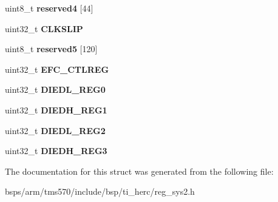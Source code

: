 \begin{DoxyCompactItemize}
uint8\+\_\+t {\bfseries reserved4} \mbox{[}44\mbox{]}
\item 
\mbox{\label{structtms570__sys2__t_a0a35694e164a15cded741c59290bd960}} 
uint32\+\_\+t {\bfseries C\+L\+K\+S\+L\+IP}
\item 
\mbox{\label{structtms570__sys2__t_a928c06fb1b47d13ab7d9c687295961b0}} 
uint8\+\_\+t {\bfseries reserved5} \mbox{[}120\mbox{]}
\item 
\mbox{\label{structtms570__sys2__t_a6b71a328a94e35321a5730135f1490ad}} 
uint32\+\_\+t {\bfseries E\+F\+C\+\_\+\+C\+T\+L\+R\+EG}
\item 
\mbox{\label{structtms570__sys2__t_a91ce45e563312e0a0119aad11ffc6da4}} 
uint32\+\_\+t {\bfseries D\+I\+E\+D\+L\+\_\+\+R\+E\+G0}
\item 
\mbox{\label{structtms570__sys2__t_abc4ed80950e84cc789a064864b6f561b}} 
uint32\+\_\+t {\bfseries D\+I\+E\+D\+H\+\_\+\+R\+E\+G1}
\item 
\mbox{\label{structtms570__sys2__t_a176374ff22142ba96e76c4019e8b7b22}} 
uint32\+\_\+t {\bfseries D\+I\+E\+D\+L\+\_\+\+R\+E\+G2}
\item 
\mbox{\label{structtms570__sys2__t_a3eabc2273ecacc568ba0a2cad0451687}} 
uint32\+\_\+t {\bfseries D\+I\+E\+D\+H\+\_\+\+R\+E\+G3}
\end{DoxyCompactItemize}


The documentation for this struct was generated from the following file\+:\begin{DoxyCompactItemize}
\item 
bsps/arm/tms570/include/bsp/ti\+\_\+herc/reg\+\_\+sys2.\+h\end{DoxyCompactItemize}
